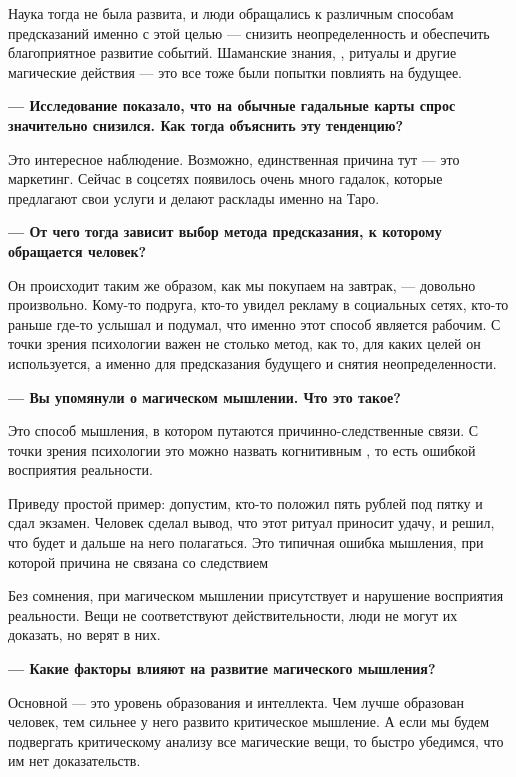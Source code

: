 Наука тогда не была развита, и люди обращались к различным способам предсказаний именно с этой целью — снизить неопределенность и обеспечить благоприятное развитие событий. Шаманские знания, , ритуалы и другие магические действия --- это все тоже были попытки повлиять на будущее.

\textbf{--- Исследование показало, что на обычные гадальные карты спрос значительно снизился. Как тогда объяснить эту тенденцию?}

Это интересное наблюдение. Возможно, единственная причина тут — это маркетинг. Сейчас в соцсетях появилось очень много гадалок, которые предлагают свои услуги и делают расклады именно на Таро.

\textbf{--- От чего тогда зависит выбор метода предсказания, к которому обращается человек?}

Он происходит таким же образом, как мы покупаем  на завтрак, — довольно произвольно. Кому-то  подруга, кто-то увидел рекламу в социальных сетях, кто-то раньше где-то услышал и подумал, что именно этот способ является рабочим. С точки зрения психологии важен не столько метод, как то, для каких целей он используется, а именно для предсказания будущего и снятия неопределенности.

\textbf{--- Вы упомянули о магическом мышлении. Что это такое?}

Это способ мышления, в котором путаются причинно-следственные связи. С точки зрения психологии это можно назвать когнитивным , то есть ошибкой восприятия реальности.

\begin{fancyquotes}
    Приведу простой пример: допустим, кто-то положил пять рублей под пятку и сдал экзамен. Человек сделал вывод, что этот ритуал приносит удачу, и решил, что будет и дальше на него полагаться. Это типичная ошибка мышления, при которой причина не связана со следствием
\end{fancyquotes}

Без сомнения, при магическом мышлении присутствует и нарушение восприятия реальности. Вещи не соответствуют действительности, люди не могут их доказать, но верят в них.

\textbf{--- Какие факторы влияют на развитие магического мышления?}

Основной — это уровень образования и интеллекта. Чем лучше образован человек, тем сильнее у него развито критическое мышление. А если мы будем подвергать критическому анализу все магические вещи, то быстро убедимся, что им нет доказательств.

